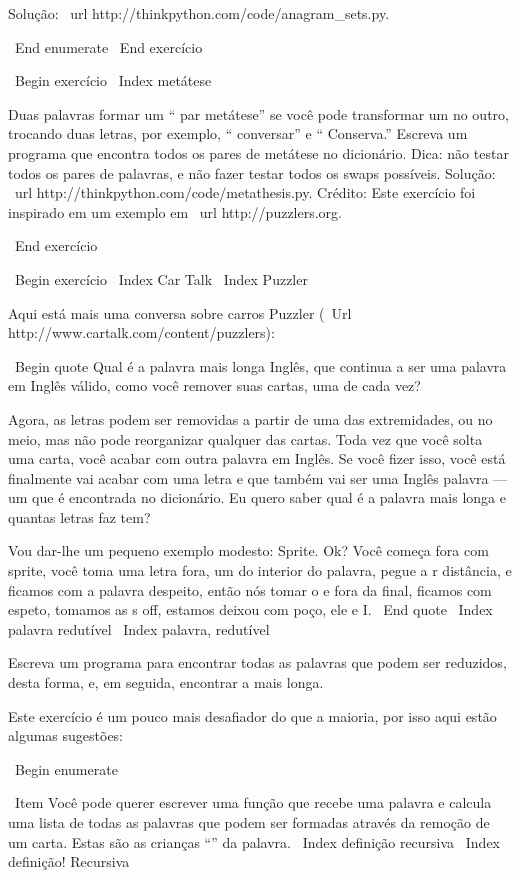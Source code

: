 \documentclass[10pt]{book}
\begin{document}
\begin {itemize}
{{{{{{{{{Solução: \ url {http://thinkpython.com/code/anagram_sets.py}.

\ End {enumerate}
\ End {} exercício

\ Begin {} exercício
\ Index {} metátese

Duas palavras formar um `` par metátese'' se você pode transformar um no
outro, trocando duas letras, por exemplo, `` conversar'' e
`` Conserva.'' Escreva um programa que encontra todos os pares de metátese
no dicionário. Dica: não testar todos os pares de palavras, e não fazer
testar todos os swaps possíveis. Solução: \ url {http://thinkpython.com/code/metathesis.py}.
Crédito: Este exercício foi inspirado em um exemplo em \ url {http://puzzlers.org}.

\ End {} exercício



\ Begin {} exercício
\ Index {Car Talk}
\ Index {} Puzzler

Aqui está mais uma conversa sobre carros Puzzler
(\ Url {http://www.cartalk.com/content/puzzlers}):

\ Begin {quote}
Qual é a palavra mais longa Inglês, que continua a ser uma palavra em Inglês válido,
como você remover suas cartas, uma de cada vez?

Agora, as letras podem ser removidas a partir de uma das extremidades, ou no meio, mas
não pode reorganizar qualquer das cartas. Toda vez que você solta uma carta, você
acabar com outra palavra em Inglês. Se você fizer isso, você está finalmente
vai acabar com uma letra e que também vai ser uma
Inglês palavra --- um que é encontrada no dicionário. Eu quero saber
qual é a palavra mais longa e quantas letras faz
tem?

Vou dar-lhe um pequeno exemplo modesto: Sprite. Ok? Você começa
fora com sprite, você toma uma letra fora, um do interior do
palavra, pegue a r distância, e ficamos com a palavra despeito, então nós
tomar o e fora da final, ficamos com espeto, tomamos as s off, estamos
deixou com poço, ele e I.
\ End {quote}
\ Index {palavra redutível}
\ Index {palavra, redutível}

Escreva um programa para encontrar todas as palavras que podem ser reduzidos, desta forma,
e, em seguida, encontrar a mais longa.

Este exercício é um pouco mais desafiador do que a maioria, por isso aqui estão
algumas sugestões:

\ Begin {enumerate}

\ Item Você pode querer escrever uma função que recebe uma palavra e
  calcula uma lista de todas as palavras que podem ser formadas através da remoção de um
  carta. Estas são as crianças ``'' da palavra.
\ Index {definição recursiva}
\ Index {definição! Recursiva}

}}}}}}}}}
\end{itemize}
\end{document}
